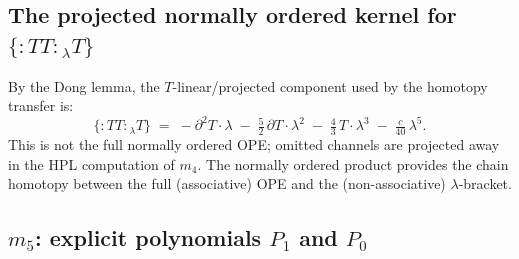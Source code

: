 \documentclass[11pt]{article}
\newcommand{\normord}[1]{:\!#1\!:}
\begin{document}
\subsection{The projected normally ordered kernel for
$\{\normord{TT}{}_\lambda T\}$}

By the Dong lemma, the $T$-linear/projected component used by the
homotopy transfer is:
\begin{equation}\label{eq:TT-T-stable}
\{\normord{TT}{}_\lambda T\}
\;=\;
-\partial^2 T\cdot\lambda
\;-\; \tfrac{5}{2}\,\partial T\cdot\lambda^2
\;-\; \tfrac{4}{3}\, T\cdot\lambda^3
\;-\; \tfrac{c}{40}\,\lambda^5.
\end{equation}
This is not the full normally ordered OPE; omitted channels are
projected away in the HPL computation of $m_4$.  The normally
ordered product provides the chain homotopy between the full
(associative) OPE and the (non-associative) $\lambda$-bracket.

\subsection{$m_5$: explicit polynomials $P_1$ and $P_0$}
\end{document}
